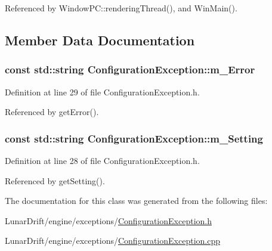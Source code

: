 Referenced by Window\+P\+C\+::rendering\+Thread(), and Win\+Main().



\subsection{Member Data Documentation}
\subsubsection[{\texorpdfstring{m\+\_\+\+Error}{m_Error}}]{\setlength{\rightskip}{0pt plus 5cm}const std\+::string Configuration\+Exception\+::m\+\_\+\+Error\hspace{0.3cm}{\ttfamily [protected]}}\hypertarget{class_configuration_exception_a0d142ec503a6f32470c6d262af2d1298}{}\label{class_configuration_exception_a0d142ec503a6f32470c6d262af2d1298}


Definition at line 29 of file Configuration\+Exception.\+h.



Referenced by get\+Error().

\subsubsection[{\texorpdfstring{m\+\_\+\+Setting}{m_Setting}}]{\setlength{\rightskip}{0pt plus 5cm}const std\+::string Configuration\+Exception\+::m\+\_\+\+Setting\hspace{0.3cm}{\ttfamily [protected]}}\hypertarget{class_configuration_exception_a5ed87e962e3bb847b29a86b5460b9370}{}\label{class_configuration_exception_a5ed87e962e3bb847b29a86b5460b9370}


Definition at line 28 of file Configuration\+Exception.\+h.



Referenced by get\+Setting().



The documentation for this class was generated from the following files\+:\begin{DoxyCompactItemize}
\item 
Lunar\+Drift/engine/exceptions/\hyperlink{_configuration_exception_8h}{Configuration\+Exception.\+h}\item 
Lunar\+Drift/engine/exceptions/\hyperlink{_configuration_exception_8cpp}{Configuration\+Exception.\+cpp}\end{DoxyCompactItemize}
